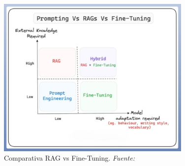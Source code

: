 \bigskip %

\begin{figure}[htbp!]
  \centering
  \includegraphics[width=0.85\textwidth,keepaspectratio]{imaxes/5_RAG_RAGvsFineTuning.png}
  \caption[Comparativa RAG vs Fine-Tuning]{Comparativa RAG vs Fine-Tuning. \textit{Fuente: \cite{Celik2023}}}
  \label{fig:5_RAG_RAGvsFineTuning}
\end{figure}


